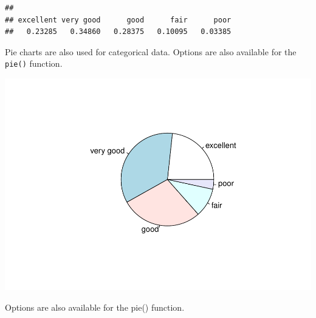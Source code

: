 \documentclass[
]{book}
\newenvironment{Shaded}{\begin{snugshade}}{\end{snugshade}}
\newcommand{\DataTypeTok}[1]{\textcolor[rgb]{0.13,0.29,0.53}{#1}}
\newcommand{\DecValTok}[1]{\textcolor[rgb]{0.00,0.00,0.81}{#1}}
\newcommand{\KeywordTok}[1]{\textcolor[rgb]{0.13,0.29,0.53}{\textbf{#1}}}
\newcommand{\NormalTok}[1]{#1}
\newcommand{\OperatorTok}[1]{\textcolor[rgb]{0.81,0.36,0.00}{\textbf{#1}}}
\newcommand{\StringTok}[1]{\textcolor[rgb]{0.31,0.60,0.02}{#1}}
\begin{document}
\begin{verbatim}
## 
## excellent very good      good      fair      poor 
##   0.23285   0.34860   0.28375   0.10095   0.03385
\end{verbatim}

Pie charts are also used for categorical data. Options are also available for the \texttt{pie()} function.

\begin{Shaded}
\end{Shaded}

\includegraphics{_main_files/figure-latex/unnamed-chunk-184-1.pdf}

Options are also available for the pie() function.

\begin{Shaded}
\end{Shaded}
\end{document}
